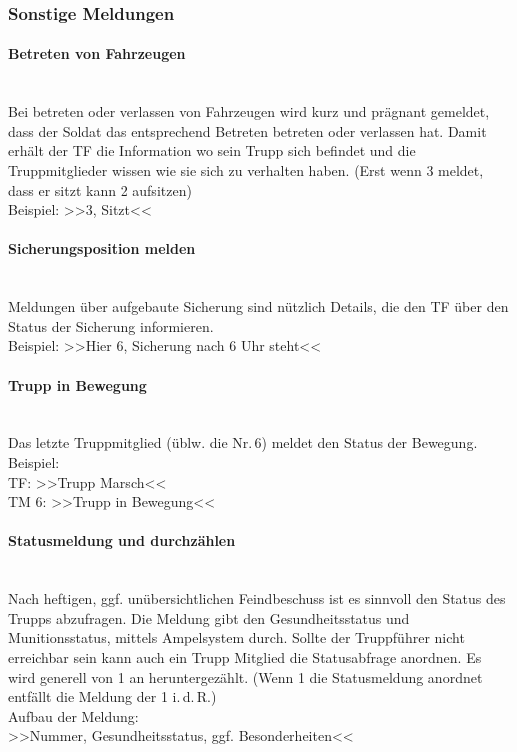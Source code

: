 \subsubsection{Sonstige Meldungen}
	\paragraph*{Betreten von Fahrzeugen}\hfil\\
	Bei betreten oder verlassen von Fahrzeugen wird kurz und prägnant gemeldet, dass der Soldat das entsprechend Betreten betreten oder verlassen hat. Damit erhält der TF die Information wo sein Trupp sich befindet und die Truppmitglieder wissen wie sie sich zu verhalten haben. (Erst wenn 3 meldet, dass er sitzt kann 2 aufsitzen)\\
	Beispiel: >>3, Sitzt<<

	\paragraph*{Sicherungsposition melden}\hfil\\
	Meldungen über aufgebaute Sicherung sind nützlich Details, die den TF über den Status der Sicherung informieren. \\
	Beispiel: >>Hier 6, Sicherung nach 6 Uhr steht<<

	\paragraph*{Trupp in Bewegung}\hfil\\
	Das letzte Truppmitglied (üblw. die Nr.\,6) meldet den Status der Bewegung.\\
	Beispiel: \\
	TF: >>Trupp Marsch<<\\
	TM 6: >>Trupp in Bewegung<<
	
	\paragraph*{Statusmeldung und durchzählen}\hfil\\
	\label{sec:Status}
	Nach heftigen, ggf. unübersichtlichen Feindbeschuss ist es sinnvoll den Status des Trupps abzufragen. Die Meldung gibt den Gesundheitsstatus und Munitionsstatus, mittels Ampelsystem durch. Sollte der Truppführer nicht erreichbar sein kann auch ein Trupp Mitglied die Statusabfrage anordnen.
	Es wird generell von 1 an heruntergezählt. (Wenn 1 die Statusmeldung anordnet entfällt die Meldung der 1 i.\,d.\,R.)  \\
	Aufbau der Meldung:\\
	>>Nummer, Gesundheitsstatus, ggf. Besonderheiten<<\\
	
